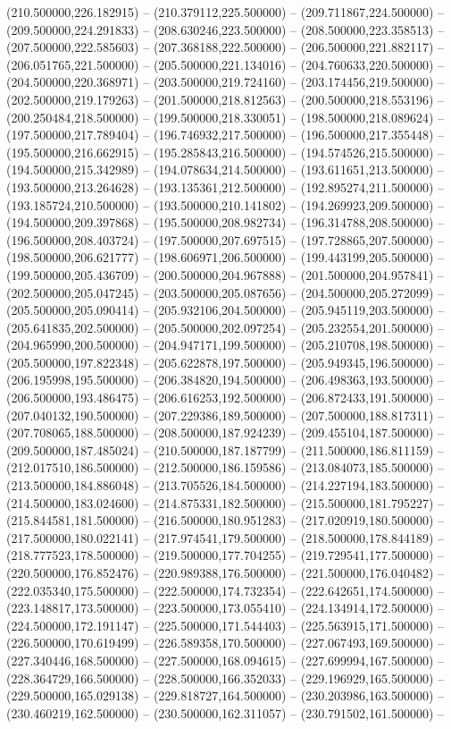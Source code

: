 (210.500000,226.182915) -- (210.379112,225.500000) -- (209.711867,224.500000) -- (209.500000,224.291833) -- (208.630246,223.500000) -- (208.500000,223.358513) -- (207.500000,222.585603) -- (207.368188,222.500000) -- (206.500000,221.882117) -- (206.051765,221.500000) -- (205.500000,221.134016) -- (204.760633,220.500000) -- (204.500000,220.368971) -- (203.500000,219.724160) -- (203.174456,219.500000) -- (202.500000,219.179263) -- (201.500000,218.812563) -- (200.500000,218.553196) -- (200.250484,218.500000) -- (199.500000,218.330051) -- (198.500000,218.089624) -- (197.500000,217.789404) -- (196.746932,217.500000) -- (196.500000,217.355448) -- (195.500000,216.662915) -- (195.285843,216.500000) -- (194.574526,215.500000) -- (194.500000,215.342989) -- (194.078634,214.500000) -- (193.611651,213.500000) -- (193.500000,213.264628) -- (193.135361,212.500000) -- (192.895274,211.500000) -- (193.185724,210.500000) -- (193.500000,210.141802) -- (194.269923,209.500000) -- (194.500000,209.397868) -- (195.500000,208.982734) -- (196.314788,208.500000) -- (196.500000,208.403724) -- (197.500000,207.697515) -- (197.728865,207.500000) -- (198.500000,206.621777) -- (198.606971,206.500000) -- (199.443199,205.500000) -- (199.500000,205.436709) -- (200.500000,204.967888) -- (201.500000,204.957841) -- (202.500000,205.047245) -- (203.500000,205.087656) -- (204.500000,205.272099) -- (205.500000,205.090414) -- (205.932106,204.500000) -- (205.945119,203.500000) -- (205.641835,202.500000) -- (205.500000,202.097254) -- (205.232554,201.500000) -- (204.965990,200.500000) -- (204.947171,199.500000) -- (205.210708,198.500000) -- (205.500000,197.822348) -- (205.622878,197.500000) -- (205.949345,196.500000) -- (206.195998,195.500000) -- (206.384820,194.500000) -- (206.498363,193.500000) -- (206.500000,193.486475) -- (206.616253,192.500000) -- (206.872433,191.500000) -- (207.040132,190.500000) -- (207.229386,189.500000) -- (207.500000,188.817311) -- (207.708065,188.500000) -- (208.500000,187.924239) -- (209.455104,187.500000) -- (209.500000,187.485024) -- (210.500000,187.187799) -- (211.500000,186.811159) -- (212.017510,186.500000) -- (212.500000,186.159586) -- (213.084073,185.500000) -- (213.500000,184.886048) -- (213.705526,184.500000) -- (214.227194,183.500000) -- (214.500000,183.024600) -- (214.875331,182.500000) -- (215.500000,181.795227) -- (215.844581,181.500000) -- (216.500000,180.951283) -- (217.020919,180.500000) -- (217.500000,180.022141) -- (217.974541,179.500000) -- (218.500000,178.844189) -- (218.777523,178.500000) -- (219.500000,177.704255) -- (219.729541,177.500000) -- (220.500000,176.852476) -- (220.989388,176.500000) -- (221.500000,176.040482) -- (222.035340,175.500000) -- (222.500000,174.732354) -- (222.642651,174.500000) -- (223.148817,173.500000) -- (223.500000,173.055410) -- (224.134914,172.500000) -- (224.500000,172.191147) -- (225.500000,171.544403) -- (225.563915,171.500000) -- (226.500000,170.619499) -- (226.589358,170.500000) -- (227.067493,169.500000) -- (227.340446,168.500000) -- (227.500000,168.094615) -- (227.699994,167.500000) -- (228.364729,166.500000) -- (228.500000,166.352033) -- (229.196929,165.500000) -- (229.500000,165.029138) -- (229.818727,164.500000) -- (230.203986,163.500000) -- (230.460219,162.500000) -- (230.500000,162.311057) -- (230.791502,161.500000) -- 